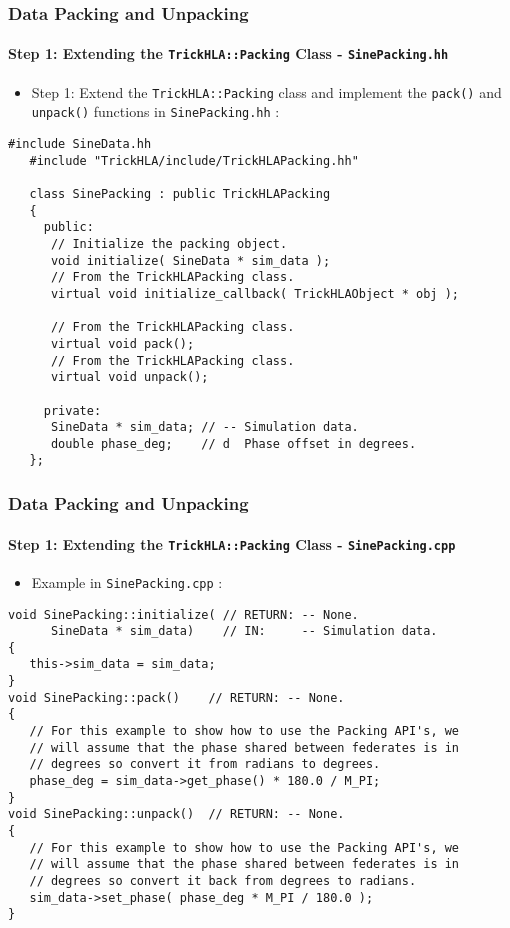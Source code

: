   \begin{frame}[fragile]
      \frametitle{Data Packing and Unpacking}
      \framesubtitle{Step 1: Extending the \texttt{TrickHLA::Packing} Class - \texttt{SinePacking.hh}}
      \begin{itemize}
         \item Step 1: Extend the \texttt{TrickHLA::Packing} class and implement
         the \texttt{pack()} and \texttt{unpack()} functions in \texttt{SinePacking.hh} :
      \end{itemize}
\begin{Verbatim}[frame=single, fontsize=\tiny]
   #include SineData.hh
   #include "TrickHLA/include/TrickHLAPacking.hh"

   class SinePacking : public TrickHLAPacking
   {
     public:
      // Initialize the packing object.
      void initialize( SineData * sim_data );
      // From the TrickHLAPacking class.
      virtual void initialize_callback( TrickHLAObject * obj );

      // From the TrickHLAPacking class.
      virtual void pack();
      // From the TrickHLAPacking class.
      virtual void unpack();

     private:
      SineData * sim_data; // -- Simulation data.
      double phase_deg;    // d  Phase offset in degrees.
   };
\end{Verbatim}
   \end{frame}

   \begin{frame}[fragile]
      \frametitle{Data Packing and Unpacking}
      \framesubtitle{Step 1: Extending the \texttt{TrickHLA::Packing} Class - \texttt{SinePacking.cpp}}
      \begin{itemize}
         \item Example in \texttt{SinePacking.cpp} :
      \end{itemize}
\begin{Verbatim}[frame=single, fontsize=\scriptsize]
void SinePacking::initialize( // RETURN: -- None.
      SineData * sim_data)    // IN:     -- Simulation data.
{
   this->sim_data = sim_data;
}
void SinePacking::pack()    // RETURN: -- None.
{
   // For this example to show how to use the Packing API's, we
   // will assume that the phase shared between federates is in
   // degrees so convert it from radians to degrees.
   phase_deg = sim_data->get_phase() * 180.0 / M_PI;
}
void SinePacking::unpack()  // RETURN: -- None.
{
   // For this example to show how to use the Packing API's, we
   // will assume that the phase shared between federates is in
   // degrees so convert it back from degrees to radians.
   sim_data->set_phase( phase_deg * M_PI / 180.0 );
}
\end{Verbatim}
   \end{frame}

